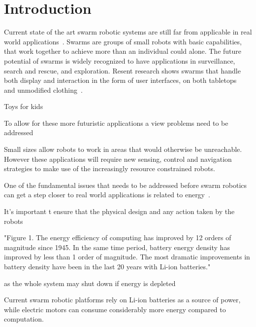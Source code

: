 \chapter{Introduction}
\label{chp:introduction}



Current state of the art swarm robotic systems are still far from applicable in real world applications~\cite{barca_sekercioglu_2013}.
Swarms are groups of small robots with basic capabilities, that work together to achieve more than an individual could alone. 
The future potential of swarms is widely recognized to have applications in surveillance, search and rescue, and exploration.
Resent research shows swarms that handle both display and interaction in the form of user interfaces, on both tabletops~\cite{legoc_uist_2016} and unmodified clothing~\cite{dementyev_uist_2016}. 

Toys for kids \cite{sony_toio_2017}


To allow for these more futuristic applications a view problems need to be addressed

Small sizes allow robots to work in areas that would otherwise be unreachable. 
However these applications will require new sensing, control and navigation strategies to make use of the increasingly resource constrained robots.
	

One of the fundamental issues that needs to be addressed before swarm robotics can get a step closer to real world applications is related to energy~\cite{barca_sekercioglu_2013}.

It's important t ensure that the physical design and any action taken by the robots 

"Figure 1. The energy efficiency of computing has improved by 12 orders of magnitude since 1945. In the same time period, battery energy density has improved by less than 1 order of magnitude. The most dramatic improvements in battery density have been in the last 20 years with Li-ion batteries."
\cite{patel_pvc_2017}

 as the whole system may shut down if energy is depleted

Current swarm robotic platforms rely on Li-ion batteries as a source of power, while electric motors can consume considerably more energy compared to computation. %



